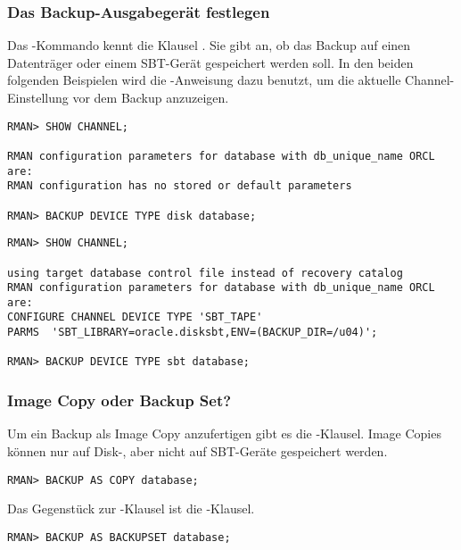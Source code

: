         \subsubsection{Das Backup-Ausgabegerät festlegen}
          Das -Kommando kennt die Klausel . Sie gibt an, ob das Backup auf einen Datenträger oder einem SBT-Gerät gespeichert werden soll. In den beiden folgenden Beispielen wird die -Anweisung dazu benutzt, um die aktuelle Channel-Einstellung vor dem Backup anzuzeigen.
\clearpage
          \begin{lstlisting}[caption={Ein Backup to Disk},label=admin1302,language=rman]
RMAN> SHOW CHANNEL;

RMAN configuration parameters for database with db_unique_name ORCL are:
RMAN configuration has no stored or default parameters

RMAN> BACKUP DEVICE TYPE disk database;
          \end{lstlisting}
          \begin{lstlisting}[caption={Ein Backup to Tape},label=admin1303,language=rman]
RMAN> SHOW CHANNEL;

using target database control file instead of recovery catalog
RMAN configuration parameters for database with db_unique_name ORCL are:
CONFIGURE CHANNEL DEVICE TYPE 'SBT_TAPE'
PARMS  'SBT_LIBRARY=oracle.disksbt,ENV=(BACKUP_DIR=/u04)';

RMAN> BACKUP DEVICE TYPE sbt database;
          \end{lstlisting}
        \subsubsection{Image Copy oder Backup Set?}
          Um ein Backup als Image Copy anzufertigen gibt es die -Klausel. Image Copies können nur auf Disk-, aber nicht auf SBT-Geräte gespeichert werden.
          \begin{lstlisting}[caption={Eine Image Copy der Datenbank erstellen},label=admin1304,language=rman]
RMAN> BACKUP AS COPY database;
          \end{lstlisting}
          Das Gegenstück zur -Klausel ist die -Klausel.
          \begin{lstlisting}[caption={Ein Backup Set der Datenbank erstellen},label=admin1305,language=rman]
RMAN> BACKUP AS BACKUPSET database;
        \end{lstlisting}
